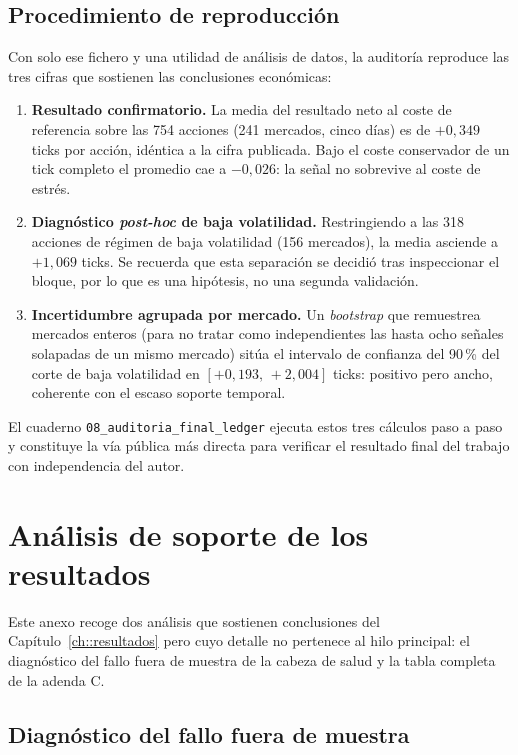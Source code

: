 \section*{Procedimiento de reproducción}

Con solo ese fichero y una utilidad de análisis de datos, la auditoría reproduce las tres
cifras que sostienen las conclusiones económicas:

\begin{enumerate}[noitemsep]
\item \textbf{Resultado confirmatorio.} La media del resultado neto al coste de referencia
sobre las 754 acciones (241 mercados, cinco días) es de $+0{,}349$ ticks por acción,
idéntica a la cifra publicada. Bajo el coste conservador de un tick completo el promedio
cae a $-0{,}026$: la señal no sobrevive al coste de estrés.
\item \textbf{Diagnóstico \emph{post-hoc} de baja volatilidad.} Restringiendo a las 318
acciones de régimen de baja volatilidad (156 mercados), la media asciende a $+1{,}069$
ticks. Se recuerda que esta separación se decidió tras inspeccionar el bloque, por lo que
es una hipótesis, no una segunda validación.
\item \textbf{Incertidumbre agrupada por mercado.} Un \emph{bootstrap} que remuestrea
mercados enteros (para no tratar como independientes las hasta ocho señales solapadas de un
mismo mercado) sitúa el intervalo de confianza del 90\,\% del corte de baja volatilidad en
$[+0{,}193,\,+2{,}004]$ ticks: positivo pero ancho, coherente con el escaso soporte
temporal.
\end{enumerate}

El cuaderno \texttt{08\_auditoria\_final\_ledger} ejecuta estos tres cálculos paso a paso y
constituye la vía pública más directa para verificar el resultado final del trabajo con
independencia del autor.


\chapter{Análisis de soporte de los resultados}
\label{anexo:soporte}

Este anexo recoge dos análisis que sostienen conclusiones del Capítulo~\ref{ch::resultados} pero cuyo detalle no pertenece al hilo principal: el diagnóstico del fallo fuera de muestra de la cabeza de salud y la tabla completa de la adenda C.

\section{Diagnóstico del fallo fuera de muestra}


